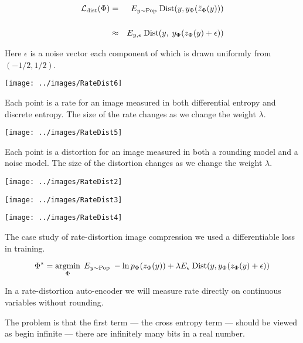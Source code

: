 {\begin{eqnarray*}
{\cal L}_{\mathrm{dist}}(\Phi) & = & E_{y \sim \mathrm{Pop}} \;\mathrm{Dist}(y,y_\Phi(\tilde{z}_\Phi(y))) \\
\\
& \approx & E_{y,\epsilon} \;\mathrm{Dist}(y,\;y_\Phi(z_\Phi(y) + \epsilon))
\end{eqnarray*}

\vfill
Here $\epsilon$ is a noise vector each component of which is drawn uniformly from $(-1/2,1/2)$.


\bigskip
\centerline{\texttt{[image: ../images/RateDist6]}}

Each point is a rate for an image measured in both differential entropy and discrete entropy.  The size of the rate changes as we change the weight $\lambda$.


\centerline{\texttt{[image: ../images/RateDist5]}}

Each point is a distortion for an image measured in both a rounding model and a noise model.  The size of the distortion changes as we change the weight $\lambda$.


\bigskip
\centerline{\texttt{[image: ../images/RateDist2]}}


\bigskip
\centerline{\texttt{[image: ../images/RateDist3]}}


\bigskip
\centerline{\texttt{[image: ../images/RateDist4]}}


The case study of rate-distortion image compression we used a differentiable loss in training.

\vfill
{\color{red} $$\Phi^* = \operatorname*{argmin}_\Phi \;E_{y \sim \mathrm{Pop}}\;- \ln p_\Phi(z_\Phi(y)) + \lambda E_\epsilon\; \mathrm{Dist}(y,y_\Phi(z_\Phi(y) + \epsilon))$$}

\vfill
In a rate-distortion auto-encoder we will measure rate directly on continuous variables without rounding.

\vfill
The problem is that the first term --- the cross entropy term --- should be viewed as begin infinite --- there are infinitely many bits in a real number.

}
